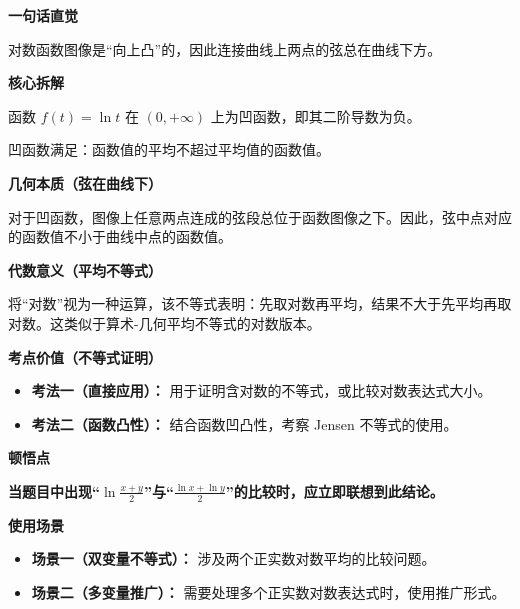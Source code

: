 \begin{explanationbox}
\textbf{\textcolor{CExplanation}{一句话直觉}}

对数函数图像是“向上凸”的，因此连接曲线上两点的弦总在曲线下方。

\medskip
\textbf{\textcolor{CExplanation}{核心拆解}}
\begin{description}[style=nextline, leftmargin=2.8em, labelsep=0.5em, itemsep=0.45em]
    \item[\textbf{要点一（凹函数定义）：}] 函数 $f(t) = \ln t$ 在 $(0, +\infty)$ 上为凹函数，即其二阶导数为负。
    \item[\textbf{要点二（Jensen不等式）：}] 凹函数满足：函数值的平均不超过平均值的函数值。
\end{description}

\medskip
\textbf{\textcolor{CExplanation}{几何本质（弦在曲线下）}}

对于凹函数，图像上任意两点连成的弦段总位于函数图像之下。因此，弦中点对应的函数值不小于曲线中点的函数值。

\medskip
\textbf{\textcolor{CExplanation}{代数意义（平均不等式）}}

将“对数”视为一种运算，该不等式表明：先取对数再平均，结果不大于先平均再取对数。这类似于算术-几何平均不等式的对数版本。

\medskip
\textbf{\textcolor{CExplanation}{考点价值（不等式证明）}}
\begin{itemize}[leftmargin=*, itemsep=0.5em, topsep=0.4em]
    \item \textbf{考法一（直接应用）：} 用于证明含对数的不等式，或比较对数表达式大小。
    \item \textbf{考法二（函数凸性）：} 结合函数凹凸性，考察 Jensen 不等式的使用。
\end{itemize}

\medskip
\textbf{\textcolor{CExplanation}{顿悟点}}

\textbf{当题目中出现“$\ln\frac{x+y}{2}$”与“$\frac{\ln x+\ln y}{2}$”的比较时，应立即联想到此结论。}

\medskip
\textbf{\textcolor{CExplanation}{使用场景}}
\begin{itemize}[leftmargin=*, itemsep=0.5em, topsep=0.4em]
    \item \textbf{场景一（双变量不等式）：} 涉及两个正实数对数平均的比较问题。
    \item \textbf{场景二（多变量推广）：} 需要处理多个正实数对数表达式时，使用推广形式。
\end{itemize}
\end{explanationbox}
